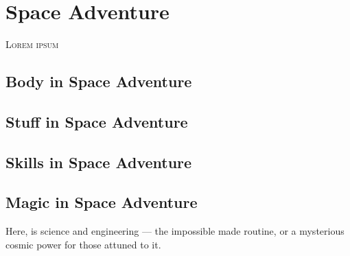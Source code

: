 \renewcommand{\realmaccent}{realmSpace}
\chapter{Space Adventure}

\begin{readaloud}
\lipsum[41][1-4]
\end{readaloud}


\lettrine{L}{orem ipsum} \lipsum[42]

\section{Body in Space Adventure}
\lipsum[43][1-4]

\section{Stuff in Space Adventure}
\lipsum[44][1-4]

\section{Skills in Space Adventure}
\lipsum[45][1-4]

\section{Magic in Space Adventure}
Here,  is science and engineering --- the impossible made
routine, or a mysterious cosmic power for those attuned to it.
\lipsum[46][1-3]

\begin{notebox}
\lipsum[47][1-3]
\end{notebox}
